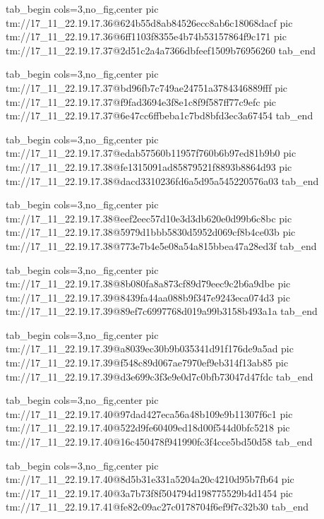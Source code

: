  
 
 
 
 

\qqSecCmtScr


\ifcmt
  tab_begin cols=3,no_fig,center
    pic tm://17_11_22.19.17.36@624b55d8ab84526ecc8ab6c18068dacf
    pic tm://17_11_22.19.17.36@6ff1103f8355e4b74b53157864f9c171
    pic tm://17_11_22.19.17.37@2d51c2a4a7366dbfeef1509b76956260
  tab_end
\fi


\ifcmt
  tab_begin cols=3,no_fig,center
    pic tm://17_11_22.19.17.37@bd96fb7c749ae24751a3784346889fff
    pic tm://17_11_22.19.17.37@f9fad3694e3f8e1c8f9f587ff77c9efc
    pic tm://17_11_22.19.17.37@6e47cc6ffbeba1c7bd8bfd3ec3a67454
  tab_end
\fi


\ifcmt
  tab_begin cols=3,no_fig,center
    pic tm://17_11_22.19.17.37@edab57560b11957f760b6b97ed81b9b0
    pic tm://17_11_22.19.17.38@fe1315091ad85879521f8893b8864d93
    pic tm://17_11_22.19.17.38@dacd3310236fd6a5d95a545220576a03
  tab_end
\fi


\ifcmt
  tab_begin cols=3,no_fig,center
    pic tm://17_11_22.19.17.38@eef2eec57d10e3d3db620e0d99b6c8bc
    pic tm://17_11_22.19.17.38@5979d1bbb5830d5952d069cf8b4ce03b
    pic tm://17_11_22.19.17.38@773e7b4e5e08a54a815bbea47a28ed3f
  tab_end
\fi


\ifcmt
  tab_begin cols=3,no_fig,center
    pic tm://17_11_22.19.17.38@8b080fa8a873cf89d79eec9c2b6a9dbe
    pic tm://17_11_22.19.17.39@8439fa44aa088b9f347e9243eca074d3
    pic tm://17_11_22.19.17.39@89ef7c6997768d019a99b3158b493a1a
  tab_end
\fi


\ifcmt
  tab_begin cols=3,no_fig,center
    pic tm://17_11_22.19.17.39@a8039ec30b9b035341d91f176de9a5ad
    pic tm://17_11_22.19.17.39@f548c89d067ae7970ef9eb314f13ab85
    pic tm://17_11_22.19.17.39@d3e699c3f3e9e0d7c0bfb73047d47fdc
  tab_end
\fi


\ifcmt
  tab_begin cols=3,no_fig,center
    pic tm://17_11_22.19.17.40@97dad427eca56a48b109e9b11307f6c1
    pic tm://17_11_22.19.17.40@522d9fe60409ed18d00f544d0bfc5218
    pic tm://17_11_22.19.17.40@16c450478f941990fc3f4cce5bd50d58
  tab_end
\fi


\ifcmt
  tab_begin cols=3,no_fig,center
    pic tm://17_11_22.19.17.40@8d5b31e331a5204a20c4210d95b7fb64
    pic tm://17_11_22.19.17.40@3a7b73f8f504794d198775529b4d1454
    pic tm://17_11_22.19.17.41@fe82c09ac27c0178704f6ef9f7c32b30
  tab_end
\fi


